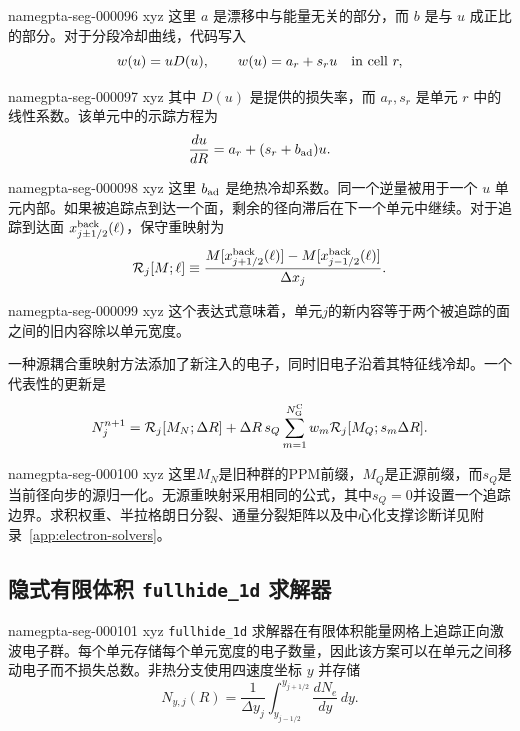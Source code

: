 \documentclass[twocolumn]{aastex702}
\makeatletter
\providecommand{\gptareaderanchor}[1]{\pdfdest name{#1} xyz}%
\providecommand{\gptareaderanchor}[1]{\special{pdf:dest (#1) [ @thispage /XYZ @xpos @ypos null ]}}%
\makeatother
\begin{document}
\gptareaderanchor{gpta-seg-000096}%
这里 \(a\) 是漂移中与能量无关的部分，而 \(b\) 是与 \(u\) 成正比的部分。对于分段冷却曲线，代码写入
\begin{equation}
w(u)=uD(u),\qquad
w(u)=a_r+s_ru\quad {\rm in\ cell}\ r,
\end{equation}

\gptareaderanchor{gpta-seg-000097}%
其中 \(D(u)\) 是提供的损失率，而 \(a_r, s_r\) 是单元 \(r\) 中的线性系数。该单元中的示踪方程为
\begin{equation}
\frac{du}{dR}=a_r+(s_r+b_{\rm ad})u .
\end{equation}

\gptareaderanchor{gpta-seg-000098}%
这里 \(b_{\rm ad}\) 是绝热冷却系数。同一个逆量被用于一个 \(u\) 单元内部。如果被追踪点到达一个面，剩余的径向滞后在下一个单元中继续。对于追踪到达面 \(x_{j\pm1/2}^{\rm back}(\ell)\)，保守重映射为
\begin{equation}
\mathcal R_j[M;\ell]\equiv
\frac{
M[x_{j+1/2}^{\rm back}(\ell)]
-M[x_{j-1/2}^{\rm back}(\ell)]
}{\Delta x_j}.
\end{equation}

\gptareaderanchor{gpta-seg-000099}%
这个表达式意味着，单元\(j\)的新内容等于两个被追踪的面之间的旧内容除以单元宽度。

一种源耦合重映射方法添加了新注入的电子，同时旧电子沿着其特征线冷却。一个代表性的更新是
\begin{equation}
N_j^{n+1}
=\mathcal R_j[M_N;\Delta R]
+\Delta R\,s_Q
\sum_{m=1}^{N_{\rm G}^{\rm C}}w_m\mathcal R_j[M_Q;s_m\Delta R].
\end{equation}

\gptareaderanchor{gpta-seg-000100}%
这里\(M_N\)是旧种群的PPM前缀，\(M_Q\)是正源前缀，而\(s_Q\)是当前径向步的源归一化。无源重映射采用相同的公式，其中\(s_Q=0\)并设置一个追踪边界。求积权重、半拉格朗日分裂、通量分裂矩阵以及中心化支撑诊断详见附录~\ref{app:electron-solvers}。

\subsection{隐式有限体积 \texttt{fullhide\_1d} 求解器}


\gptareaderanchor{gpta-seg-000101}%
\texttt{fullhide\_1d} 求解器在有限体积能量网格上追踪正向激波电子群。每个单元存储每个单元宽度的电子数量，因此该方案可以在单元之间移动电子而不损失总数。非热分支使用四速度坐标 \(y\) 并存储
\begin{equation}
N_{y,j}(R)=\frac{1}{\Delta y_j}
\int_{y_{j-1/2}}^{y_{j+1/2}}\frac{dN_e}{dy}\,dy .
\label{eq:fullhide-cell-average}
\end{equation}
\end{document}
